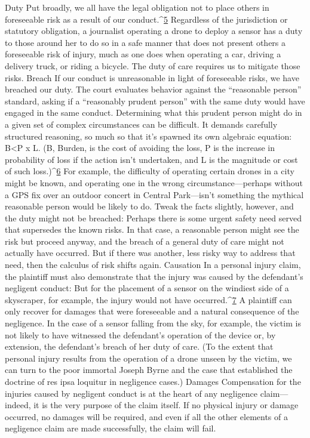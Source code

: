 Duty
Put broadly, we all have the legal obligation not to place others in foreseeable
risk as a result of our conduct.^{\href{#endnotes-sullivan}{5}} Regardless of the jurisdiction or statutory
obligation, a journalist operating a drone to deploy a sensor has a duty
to those around her to do so in a safe manner that does not present others a
foreseeable risk of injury, much as one does when operating a car, driving a
delivery truck, or riding a bicycle. The duty of care requires us to mitigate
those risks.
Breach
If our conduct is unreasonable in light of foreseeable risks, we have breached
our duty. The court evaluates behavior against the ``reasonable person'' standard,
asking if a ``reasonably prudent person'' with the same duty would
have engaged in the same conduct. Determining what this prudent person
might do in a given set of complex circumstances can be difficult. It
demands carefully structured reasoning, so much so that it's spawned its
own algebraic equation: B<P x L. (B, Burden, is the cost of avoiding the loss,
P is the increase in probability of loss if the action isn't undertaken, and L is
the magnitude or cost of such loss.)^{\href{#endnotes-sullivan}{6}}
For example, the difficulty of operating certain drones in a city might be
known, and operating one in the wrong circumstance—perhaps without
a GPS fix over an outdoor concert in Central Park—isn't something the
mythical reasonable person would be likely to do. Tweak the facts slightly,
however, and the duty might not be breached: Perhaps there is some urgent
safety need served that supersedes the known risks. In that case, a reasonable person might see the risk but proceed anyway, and the breach of a general
duty of care might not actually have occurred. But if there was another,
less risky way to address that need, then the calculus of risk shifts again.
Causation
In a personal injury claim, the plaintiff must also demonstrate that the injury
was caused by the defendant's negligent conduct: But for the placement of a
sensor on the windiest side of a skyscraper, for example, the injury would
not have occurred.^{\href{#endnotes-sullivan}{7}} A plaintiff can only recover for damages that were foreseeable
and a natural consequence of the negligence.
In the case of a sensor falling from the sky, for example, the victim is not
likely to have witnessed the defendant's operation of the device or, by extension,
the defendant's breach of her duty of care. (To the extent that personal
injury results from the operation of a drone unseen by the victim, we can
turn to the poor immortal Joseph Byrne and the case that established the
doctrine of res ipsa loquitur in negligence cases.)
Damages
Compensation for the injuries caused by negligent conduct is at the heart
of any negligence claim—indeed, it is the very purpose of the claim itself.
If no physical injury or damage occurred, no damages will be required, and
even if all the other elements of a negligence claim are made successfully,
the claim will fail.


